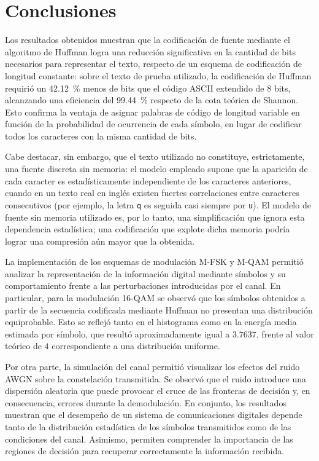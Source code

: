 \section{Conclusiones}

Los resultados obtenidos muestran que la codificación de fuente mediante el algoritmo de
Huffman logra una reducción significativa en la cantidad de bits necesarios para representar
el texto, respecto de un esquema de codificación de longitud constante: sobre el texto de
prueba utilizado, la codificación de Huffman requirió un \qty{42.12}{\percent} menos de bits
que el código ASCII extendido de 8 bits, alcanzando una eficiencia del \qty{99.44}{\percent}
respecto de la cota teórica de Shannon. Esto confirma la ventaja de asignar palabras de código
de longitud variable en función de la probabilidad de ocurrencia de cada símbolo, en lugar de
codificar todos los caracteres con la misma cantidad de bits.

Cabe destacar, sin embargo, que el texto utilizado no constituye, estrictamente, una fuente
discreta sin memoria: el modelo empleado supone que la aparición de cada caracter es
estadísticamente independiente de los caracteres anteriores, cuando en un texto real en inglés
existen fuertes correlaciones entre caracteres consecutivos (por ejemplo, la letra
\texttt{q} es seguida casi siempre por \texttt{u}). El modelo de fuente sin memoria utilizado
es, por lo tanto, una simplificación que ignora esta dependencia estadística; una codificación
que explote dicha memoria podría lograr una compresión aún mayor que la obtenida.

La implementación de los esquemas de modulación M-FSK y
M-QAM permitió analizar la representación de la información
digital mediante símbolos y su comportamiento frente a
las perturbaciones introducidas por el canal.
En particular, para la modulación 16-QAM se observó que
los símbolos obtenidos a partir de la secuencia codificada
mediante Huffman no presentan una distribución equiprobable.
Esto se reflejó tanto en el histograma como en la energía media estimada por símbolo,
que resultó aproximadamente igual a $3.7637$, frente al
valor teórico de $4$ correspondiente a una distribución
uniforme.

Por otra parte, la simulación del canal permitió visualizar
los efectos del ruido AWGN
sobre la constelación transmitida. Se observó que
el ruido introduce una dispersión aleatoria que puede
provocar el cruce de las fronteras de decisión y, en
consecuencia, errores durante la demodulación.
En conjunto, los resultados muestran que el desempeño
de un sistema de comunicaciones digitales depende tanto
de la distribución estadística de los símbolos transmitidos
como de las condiciones del canal. Asimismo, permiten
comprender la importancia de las regiones de decisión
para recuperar correctamente la información recibida.


